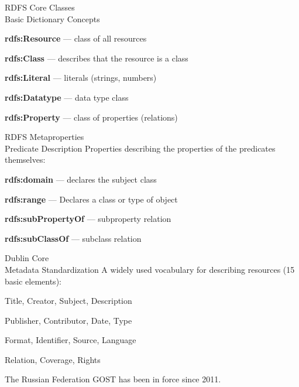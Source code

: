 \begin{frame}{RDFS Core Classes\\Basic Dictionary Concepts}
	\topline
	\justifying
	\begin{textitemize}
		\item \textbf{rdfs:Resource} --- class of all resources
		\item \textbf{rdfs:Class} --- describes that the resource is a class
		\item \textbf{rdfs:Literal} --- literals (strings, numbers)
		\item \textbf{rdfs:Datatype} --- data type class
		\item \textbf{rdfs:Property} --- class of properties (relations)
	\end{textitemize}
\end{frame}

\begin{frame}{RDFS Metaproperties\\Predicate Description}
	\topline
	\justifying
	Properties describing the properties of the predicates themselves:
	
	\begin{textitemize}
		\item \textbf{rdfs:domain} --- declares the subject class
		\item \textbf{rdfs:range} --- Declares a class or type of object
		\item \textbf{rdfs:subPropertyOf} --- subproperty relation
		\item \textbf{rdfs:subClassOf} --- subclass relation
	\end{textitemize}
\end{frame}

\begin{frame}{Dublin Core\\Metadata Standardization}
	\topline
	\justifying
	A widely used vocabulary for describing resources (15 basic elements):
	\begin{textitemize}
		\item Title, Creator, Subject, Description
		\item Publisher, Contributor, Date, Type
		\item Format, Identifier, Source, Language
		\item Relation, Coverage, Rights
	\end{textitemize}
	
	The Russian Federation GOST has been in force since 2011.
\end{frame}

